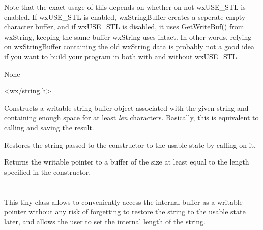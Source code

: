 Note that the exact usage of this depends on whether on not wxUSE\_STL is enabled.  If
wxUSE\_STL is enabled, wxStringBuffer creates a seperate empty character buffer, and
if wxUSE\_STL is disabled, it uses GetWriteBuf() from wxString, keeping the same buffer
wxString uses intact.  In other words, relying on wxStringBuffer containing the old 
wxString data is probably not a good idea if you want to build your program in both
with and without wxUSE\_STL.


None


<wx/string.h>


\label{wxstringbufferctor}


Constructs a writable string buffer object associated with the given string
and containing enough space for at least {\it len} characters. Basically, this
is equivalent to calling  and
saving the result.

\label{wxstringbufferdtor}


Restores the string passed to the constructor to the usable state by calling 
 on it.

\label{wxstringbufferwxchar}


Returns the writable pointer to a buffer of the size at least equal to the
length specified in the constructor.



\section{}\label{wxstringbufferlength}

This tiny class allows to conveniently access the  
internal buffer as a writable pointer without any risk of forgetting to restore
the string to the usable state later, and allows the user to set the internal
length of the string.

